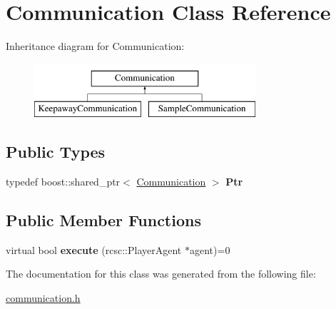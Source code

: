 \hypertarget{classCommunication}{
\section{Communication Class Reference}
\label{classCommunication}
}
Inheritance diagram for Communication:\begin{figure}[H]
\begin{center}
\leavevmode
\includegraphics[height=2.000000cm]{classCommunication}
\end{center}
\end{figure}
\subsection*{Public Types}
\begin{DoxyCompactItemize}
\item 
\hypertarget{classCommunication_a03f562d78c5354e30178a7f6f2c8db38}{
typedef boost::shared\_\-ptr$<$ \hyperlink{classCommunication}{Communication} $>$ {\bfseries Ptr}}
\label{classCommunication_a03f562d78c5354e30178a7f6f2c8db38}

\end{DoxyCompactItemize}
\subsection*{Public Member Functions}
\begin{DoxyCompactItemize}
\item 
\hypertarget{classCommunication_a23b0ee312859679a688176ff2cb7e946}{
virtual bool {\bfseries execute} (rcsc::PlayerAgent $\ast$agent)=0}
\label{classCommunication_a23b0ee312859679a688176ff2cb7e946}

\end{DoxyCompactItemize}


The documentation for this class was generated from the following file:\begin{DoxyCompactItemize}
\item 
\hyperlink{communication_8h}{communication.h}\end{DoxyCompactItemize}
